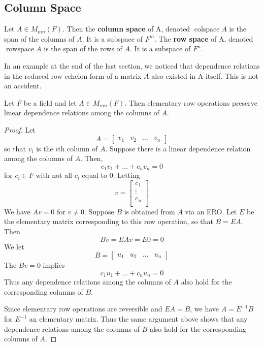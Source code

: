 \documentclass{article}
\DeclareMathOperator{\colspace}{colspace}
\DeclareMathOperator{\rowspace}{rowspace}
\begin{document}
  \subsection{Column Space}
  \begin{definition}
    Let $A \in M_{mn}(F)$. Then the \textbf{column space} of A, denoted $\colspace A$ is the span of the columns of $A$. It is a subspace of $F^m$. The \textbf{row space} of A, denoted $\rowspace A$ is the span of the rows of $A$. It is a subspace of $F^n$.
  \end{definition}
  \begin{remark}
    In an example at the end of the last section, we noticed that
    dependence relations in the reduced row echelon form of a matrix $A$ also
    existed in A itself. This is not an accident.
  \end{remark}
  \begin{theorem}
    Let $F$ be a field and let $A \in M_{mn}(F)$. Then elementary row operations preserve linear dependence relations among the columns of $A$.
  \end{theorem}
  \begin{proof}
    Let \[
      A =
      \begin{bmatrix}
        v_1 & v_2 & \dots & v_n
      \end{bmatrix}
    \]
    so that $v_i$ is the $i$th column of $A$. Suppose there is a linear dependence relation among the columns of $A$. Then, \[
      c_1v_1 + \dots + c_nv_n = 0
    \] for $c_i \in F$ with not all $c_i$ equal to $0$. Letting \[
      v =
      \begin{bmatrix}
        c_1\\
        \vdots\\
        c_n\\
      \end{bmatrix}
    \]
    We have $Av = 0$ for $v \neq 0$.
    Suppose $B$ is obtained from $A$ via an ERO. Let $E$ be the elementary matrix corresponding to this row operation, so that $B = EA$. Then \[
      Bv = EAv = E0 = 0
    \]
    We let \[
      B =
      \begin{bmatrix}
        u_1 & u_2 & \dots & u_n
      \end{bmatrix}
    \]
    The $Bv = 0$ implies \[
      c_1u_1 + \dots + c_nu_n = 0
    \]
    Thus any dependence relations among the columns of $A$ also hold for the corresponding columns of $B$.

    Since elementary row operations are reversible and $EA = B$, we have $A = E^{-1}B$ for $E^{-1}$ an elementary matrix. Thus the same argument above shows that any dependence relations among the columns of $B$ also hold for the corresponding columns of $A$.
  \end{proof}
\end{document}
